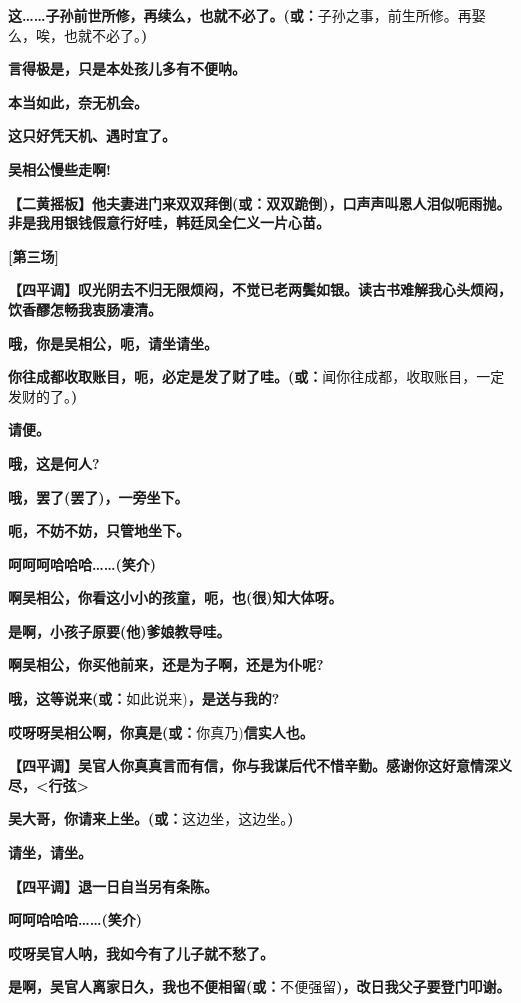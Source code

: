 \textbf{这\ldots{}\ldots{}子孙前世所修，再续么，也就不必了。(或：}子孙之事，前生所修。再娶么，唉，也就不必了。\textbf{)}

\textbf{言得极是，只是本处孩儿多有不便呐。}

\textbf{本当如此，奈无机会。}

\textbf{这只好凭天机、遇时宜了。}

\textbf{吴相公慢些走啊!}

\textbf{【二黄摇板】他夫妻进门来双双拜倒(或：双双跪倒)，口声声叫恩人泪似呃雨抛。非是我用银钱假意行好哇，韩廷凤全仁义一片心苗。}

\textbf{{[}第三场{]}}

\textbf{【四平调】叹光阴去不归无限烦闷，不觉已老两鬓如银。读古书难解我心头烦闷，饮香醪怎畅我衷肠凄清。}

\textbf{哦，你是吴相公，呃，请坐请坐。}

\textbf{你往成都收取账目，呃，必定是发了财了哇。(或：}闻你往成都，收取账目，一定发财的了。\textbf{)}

\textbf{请便。}

\textbf{哦，这是何人?}

\textbf{哦，罢了(罢了)，一旁坐下。}

\textbf{呃，不妨不妨，只管地坐下。}

\textbf{呵呵呵哈哈哈\ldots{}\ldots{}(笑介)}

\textbf{啊吴相公，你看这小小的孩童，呃，也(很)知大体呀。}

\textbf{是啊，小孩子原要(他)爹娘教导哇。}

\textbf{啊吴相公，你买他前来，还是为子啊，还是为仆呢?}

\textbf{哦，这等说来(或：}如此说来)\textbf{，是送与我的?}

\textbf{哎呀呀吴相公啊，你真是(或：}你真乃)\textbf{信实人也。}

\textbf{【四平调】吴官人你真真言而有信，你与我谋后代不惜辛勤。感谢你这好意情深义尽，\textless{}行弦\textgreater{}}

\textbf{吴大哥，你请来上坐。(或：}这边坐，这边坐。\textbf{)}

\textbf{请坐，请坐。}

\textbf{【四平调】退一日自当另有条陈。}

\textbf{呵呵哈哈哈\ldots{}\ldots{}(笑介)}

\textbf{哎呀吴官人呐，我如今有了儿子就不愁了。}

\textbf{是啊，吴官人离家日久，我也不便相留(或：}不便强留\textbf{)，改日我父子要登门叩谢。}

